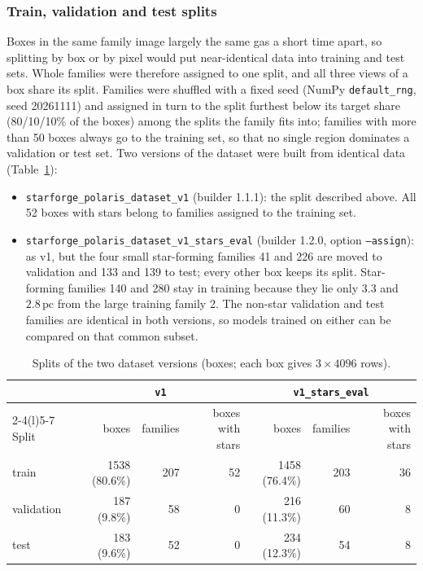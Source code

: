 \subsubsection{Train, validation and test splits}
\label{sec:dataset:splits}

Boxes in the same family image largely the same gas a short time apart, so splitting by box or by pixel would put
near-identical data into training and test sets. Whole families were therefore assigned to one split, and all
three views of a box share its split. Families were shuffled with a fixed seed (NumPy \texttt{default\_rng},
seed 20261111) and assigned in turn to the split furthest below its target share (80/10/10\% of the boxes) among
the splits the family fits into; families with more than 50 boxes always go to the training set, so that no single
region dominates a validation or test set. Two versions of the dataset were built from identical data
(Table~\ref{tab:splits}):

\begin{itemize}
  \item \texttt{starforge\_polaris\_dataset\_v1} (builder 1.1.1): the split described above. All 52 boxes with
  stars belong to families assigned to the training set.
  \item \texttt{starforge\_polaris\_dataset\_v1\_stars\_eval} (builder 1.2.0, option \texttt{--assign}): as v1, but
  the four small star-forming families 41 and 226 are moved to validation and 133 and 139 to test; every other box
  keeps its split. Star-forming families 140 and 280 stay in training because they lie only $3.3$ and
  $2.8\,\mathrm{pc}$ from the large training family 2. The non-star validation and test families are identical in
  both versions, so models trained on either can be compared on that common subset.
\end{itemize}

\begin{table}[ht]
  \centering
  \caption{Splits of the two dataset versions (boxes; each box gives $3\times4096$ rows).}
  \label{tab:splits}
  \small
  \begin{tabular}{@{}lrrrrrr@{}}
    \toprule
     & \multicolumn{3}{c}{\texttt{v1}} & \multicolumn{3}{c}{\texttt{v1\_stars\_eval}} \\
    \cmidrule(lr){2-4}\cmidrule(l){5-7}
    Split & boxes & families & boxes with stars & boxes & families & boxes with stars \\
    \midrule
    train      & 1538 (80.6\%) & 207 & 52 & 1458 (76.4\%) & 203 & 36 \\
    validation &  187 (9.8\%)  &  58 &  0 &  216 (11.3\%) &  60 &  8 \\
    test       &  183 (9.6\%)  &  52 &  0 &  234 (12.3\%) &  54 &  8 \\
    \bottomrule
  \end{tabular}
\end{table}

